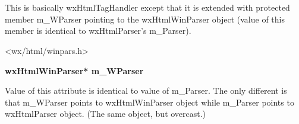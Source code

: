 %
%

\section{}\label{wxhtmlwintaghandler}

This is basically wxHtmlTagHandler except that
it is extended with protected member m\_WParser pointing to
the wxHtmlWinParser object (value of this member is identical
to wxHtmlParser's m\_Parser).




<wx/html/winpars.h>



\label{wxhtmlwintaghandlerwxhtmlwintaghandlermwparser}

{\bf wxHtmlWinParser* m\_WParser}

Value of this attribute is identical to value of m\_Parser. The only different
is that m\_WParser points to wxHtmlWinParser object while m\_Parser
points to wxHtmlParser object. (The same object, but overcast.)

